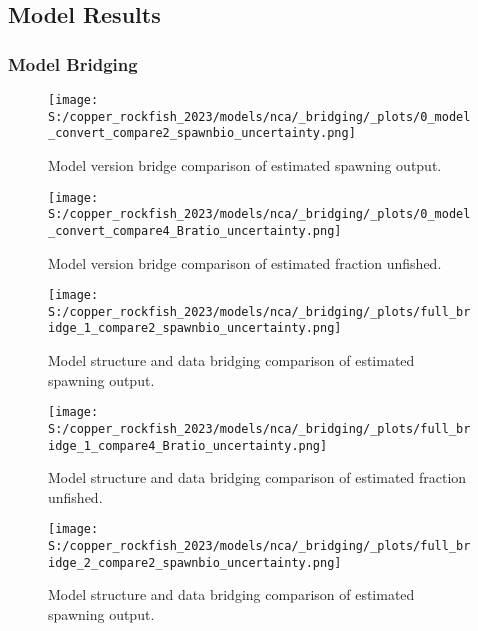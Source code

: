 \documentclass[11pt,
  english,
  letterpaper,
]{article}
\begin{document}
\hypertarget{model-results}{%
\subsection{Model Results}\label{model-results}}

\hypertarget{model-bridging}{%
\subsubsection{Model Bridging}\label{model-bridging}}

\begin{figure}
\centering
\texttt{[image: S:/copper\_rockfish\_2023/models/nca/\_bridging/\_plots/0\_model\_convert\_compare2\_spawnbio\_uncertainty.png]}
\caption{Model version bridge comparison of estimated spawning output.\label{fig:bridge-ssb}}
\end{figure}

\pagebreak

\begin{figure}
\centering
\texttt{[image: S:/copper\_rockfish\_2023/models/nca/\_bridging/\_plots/0\_model\_convert\_compare4\_Bratio\_uncertainty.png]}
\caption{Model version bridge comparison of estimated fraction unfished.\label{fig:bridge-depl}}
\end{figure}

\pagebreak

\begin{figure}
\centering
\texttt{[image: S:/copper\_rockfish\_2023/models/nca/\_bridging/\_plots/full\_bridge\_1\_compare2\_spawnbio\_uncertainty.png]}
\caption{Model structure and data bridging comparison of estimated spawning output.\label{fig:data-bridge-ssb-1}}
\end{figure}

\pagebreak

\begin{figure}
\centering
\texttt{[image: S:/copper\_rockfish\_2023/models/nca/\_bridging/\_plots/full\_bridge\_1\_compare4\_Bratio\_uncertainty.png]}
\caption{Model structure and data bridging comparison of estimated fraction unfished.\label{fig:data-bridge-depl-1}}
\end{figure}

\pagebreak

\begin{figure}
\centering
\texttt{[image: S:/copper\_rockfish\_2023/models/nca/\_bridging/\_plots/full\_bridge\_2\_compare2\_spawnbio\_uncertainty.png]}
\caption{Model structure and data bridging comparison of estimated spawning output.\label{fig:data-bridge-ssb-2}}
\end{figure}
\end{document}
